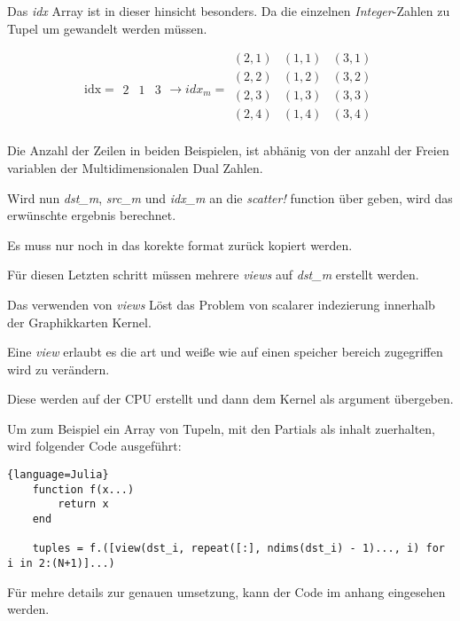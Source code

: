 Das \textit{idx} Array ist in dieser hinsicht besonders.
Da die einzelnen \textit{Integer}-Zahlen zu Tupel um gewandelt werden müssen. 

$$

\text{idx}= 

\begin{matrix}
 2 & 1 & 3
\end{matrix}

\rightarrow

idx_m = 

\begin{matrix}
 (2, 1) & (1, 1) & (3, 1) \\ 
 (2, 2) & (1, 2) & (3, 2) \\
 (2, 3) & (1, 3) & (3, 3) \\
 (2, 4) & (1, 4) & (3, 4) \\
\end{matrix}
$$

Die Anzahl der Zeilen in beiden Beispielen, ist abhänig von der anzahl der Freien variablen  
der Multidimensionalen Dual Zahlen.

Wird nun \textit{dst_m}, \textit{src_m} und \textit{idx_m} an die \textit{scatter!} function über
geben, wird das erwünschte ergebnis berechnet. 

Es muss nur noch in das korekte format zurück kopiert werden. 

Für diesen Letzten schritt müssen mehrere \textit{views} auf
\textit{dst_m} erstellt werden.

Das verwenden von \textit{views} Löst das Problem von scalarer indezierung innerhalb der Graphikkarten Kernel. 

Eine \textit{view} erlaubt es die art und weiße wie auf einen speicher bereich zugegriffen wird zu verändern.

Diese werden auf der CPU erstellt und dann dem Kernel als argument übergeben.

Um zum Beispiel ein Array von Tupeln, mit den Partials als inhalt zuerhalten, wird folgender Code ausgeführt:

\begin{lstlisting}{language=Julia}
	function f(x...)
		return x
	end
	
	tuples = f.([view(dst_i, repeat([:], ndims(dst_i) - 1)..., i) for i in 2:(N+1)]...)
\end{lstlisting}


Für mehre details zur genauen umsetzung, kann der Code im anhang eingesehen werden.

